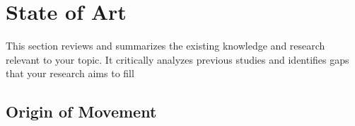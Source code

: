 \section{State of Art}
This section reviews and summarizes the existing knowledge and research relevant to your topic. It critically analyzes previous studies and identifies gaps that your research aims to fill\\


\subsection{Origin of Movement}
